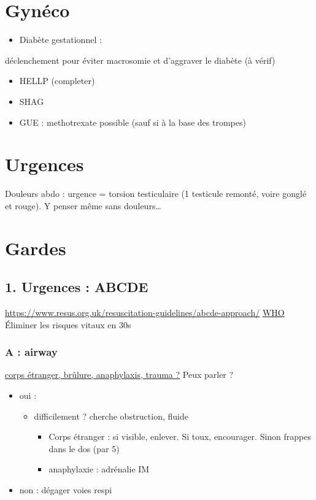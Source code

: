 \documentclass[11pt]{article}
\begin{document}
\section{Gynéco}
\label{sec:org745e20f}
\begin{itemize}
\item Diabète gestationnel :
\end{itemize}
déclenchement pour éviter macrosomie et d'aggraver le diabète (à vérif)
\begin{itemize}
\item HELLP (completer)
\item SHAG
\item GUE : methotrexate possible (sauf si à la base des trompes)
\end{itemize}


\section{Urgences}
\label{sec:orge8fb1a3}
Douleurs abdo : urgence = torsion testiculaire (1 testicule remonté, voire
gonglé et rouge). Y penser même sans douleurs\ldots{}

\section{Gardes}
\label{sec:org17716bc}
\subsection{1. Urgences : ABCDE}
\label{sec:orgabe5982}
\url{https://www.resus.org.uk/resuscitation-guidelines/abcde-approach/}
\href{https://www.google.com/url?sa=t\&rct=j\&q=\&esrc=s\&source=web\&cd=12\&ved=2ahUKEwjqre3gkezkAhWPohQKHWVxAygQFjALegQIBBAC\&url=https\%3A\%2F\%2Fwww.who.int\%2Femergencycare\%2Fpublications\%2FBEC\_ABCDE\_Approach\_2018a.pdf\&usg=AOvVaw3Cu1L7fniTpCUwq9PwOeap}{WHO}
Éliminer les risques vitaux en 30s
\subsubsection{A : airway}
\label{sec:orgb9972b6}
\uline{corps étranger, brûlure, anaphylaxis, trauma ?}
Peux parler ?
\begin{itemize}
\item oui :
\begin{itemize}
\item difficilement ? cherche obstruction, fluide
\begin{itemize}
\item Corps étranger : si visible, enlever. Si toux, encourager. Sinon frappes
dans le dos (par 5)
\item anaphylaxie : adrénalie IM
\end{itemize}
\end{itemize}
\item non : dégager voies respi
\end{itemize}
\end{document}
